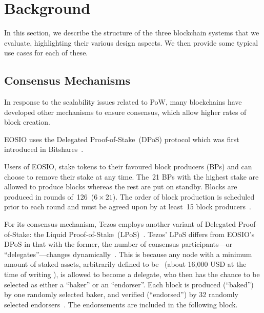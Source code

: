 \section{Background}
\label{sec:background}

In this section, we describe the structure of the three blockchain systems that we evaluate, highlighting their various design aspects. We then provide some typical use cases for each of these.

\subsection{Consensus Mechanisms}

In response to the scalability issues related to PoW, many blockchains have developed other mechanisms to ensure consensus, which allow higher rates of block creation.

\label{sec:DPoS}
EOSIO uses the Delegated Proof-of-Stake~(DPoS) protocol which was first introduced in Bitshares~\cite{bitshares}.

Users of EOSIO, stake  tokens to their favoured block producers (BPs) and can choose to remove their stake at any time. 
The~21 BPs with the highest stake are allowed to produce blocks whereas the rest are put on standby. 
Blocks are produced in rounds of~126~($6 \times 21$). 
The order of block production is scheduled prior to each round and must be agreed upon by at least~15 block producers~\cite{EOS}.


For its consensus mechanism, Tezos employs another variant of Delegated Proof-of-Stake: the Liquid Proof-of-Stake~(LPoS)~\cite{Tezos2018}.
Tezos' LPoS differs from EOSIO's DPoS in that with the former, the number of consensus participants---or ``delegates''---changes dynamically~\cite{Tezos2018, Goodman2014}.
This is because any node with a minimum amount of staked assets, arbitrarily defined to be~  (about 16,000 USD at the time of writing \cite{CoinMarketCap2020}), is allowed to become a delegate, who then has the chance to be selected as either a ``baker'' or an ``endorser''.
Each block is produced (``baked'') by one randomly selected baker, and verified (``endorsed'') by 32 randomly selected endorsers~\cite{Tezos2018}. 
The endorsements are included in the following block.

